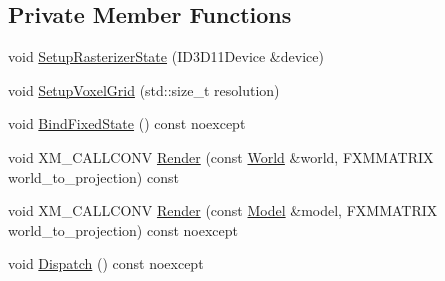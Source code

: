 \subsection*{Private Member Functions}
\begin{DoxyCompactItemize}
\item 
void \mbox{\hyperlink{classmage_1_1rendering_1_1_voxelization_pass_a7f8af2ecd3eb69f4f052be7b9ce67650}{Setup\+Rasterizer\+State}} (I\+D3\+D11\+Device \&device)
\item 
void \mbox{\hyperlink{classmage_1_1rendering_1_1_voxelization_pass_aa2f77d755bd4d4173a3c791fac5298c9}{Setup\+Voxel\+Grid}} (std\+::size\+\_\+t resolution)
\item 
void \mbox{\hyperlink{classmage_1_1rendering_1_1_voxelization_pass_ae69d6465ab918f12940339436fe56c56}{Bind\+Fixed\+State}} () const noexcept
\item 
void X\+M\+\_\+\+C\+A\+L\+L\+C\+O\+NV \mbox{\hyperlink{classmage_1_1rendering_1_1_voxelization_pass_a1f29b02c3e4557518c78dad993d3e482}{Render}} (const \mbox{\hyperlink{classmage_1_1rendering_1_1_world}{World}} \&world, F\+X\+M\+M\+A\+T\+R\+IX world\+\_\+to\+\_\+projection) const
\item 
void X\+M\+\_\+\+C\+A\+L\+L\+C\+O\+NV \mbox{\hyperlink{classmage_1_1rendering_1_1_voxelization_pass_aa993ec5ff093f3948f13bf3187a11e6c}{Render}} (const \mbox{\hyperlink{classmage_1_1rendering_1_1_model}{Model}} \&model, F\+X\+M\+M\+A\+T\+R\+IX world\+\_\+to\+\_\+projection) const noexcept
\item 
void \mbox{\hyperlink{classmage_1_1rendering_1_1_voxelization_pass_a5026abcbe3aad3627e96ee055df8b842}{Dispatch}} () const noexcept
\end{DoxyCompactItemize}
